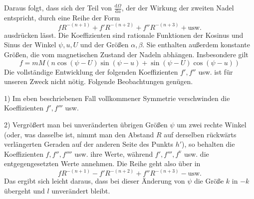 Daraus folgt, dass sich der Teil von $\frac{\mathrm{d}\Omega}{\mathrm{d}u}$, der der Wirkung der zweiten Nadel entspricht, durch eine Reihe der Form
\[
fR^{-(n+1)}+f'R^{-(n+2)}+f''R^{-(n+3)}+\text{usw.}
\]
ausdrücken lässt. Die Koeffizienten sind rationale Funktionen der Kosinus und Sinus der Winkel $\psi,u,U$ und der Größen $\alpha,\beta$. Sie enthalten außerdem konstante Größen, die vom magnetischen Zustand der Nadeln abhängen. Insbesondere gilt
\[
f=mM(n\cos(\psi-U)\sin(\psi-u)+\sin(\psi-U)\cos(\psi-u))
\]
Die vollständige Entwicklung der folgenden Koeffizienten $f',f''$ usw. ist für unseren Zweck nicht nötig. Folgende Beobachtungen genügen.

1) Im eben beschriebenen Fall vollkommener Symmetrie verschwinden die Koeffizienten $f',f'''$ usw.

2) Vergrößert man bei unveränderten übrigen Größen $\psi$ um zwei rechte Winkel (oder, was dasselbe ist, nimmt man den Abstand $R$ auf derselben rückwärts verlängerten Geraden auf der anderen Seite des Punkts $h'$), so behalten die Koeffizienten $f,f'',f''''$ usw. ihre Werte, während $f',f''',f^{\mathrm{v}}$ usw. die entgegengesetzten Werte annehmen. Die Reihe geht also über in
\[
fR^{-(n+1)}-f'R^{-(n+2)}+f''R^{-(n+3)}-\text{usw.}
\]
Das ergibt sich leicht daraus, dass bei dieser Änderung von $\psi$ die Größe $k$ in $-k$ übergeht und $l$ unverändert bleibt.

